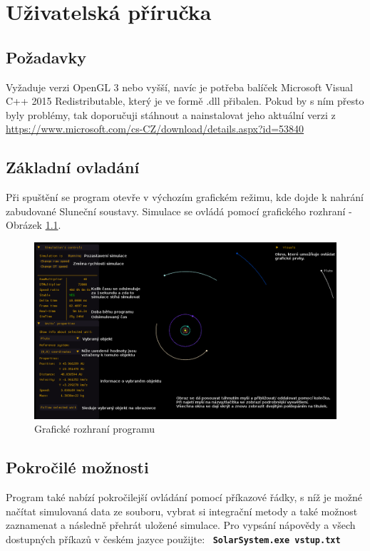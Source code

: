 \chapter{Uživatelská příručka}
\label{chap:userGuide}
\section{Požadavky}
Vyžaduje verzi OpenGL 3 nebo vyšší, navíc je potřeba balíček Microsoft Visual C++ 2015 Redistributable, který je ve formě .dll přibalen. Pokud by s ním přesto byly problémy, tak doporučuji stáhnout  a nainstalovat jeho aktuální verzi z \url{https://www.microsoft.com/cs-CZ/download/details.aspx?id=53840}
\section{Základní ovladání}
Při spuštění se program otevře v výchozím grafickém režimu, kde dojde k nahrání zabudované Sluneční soustavy. Simulace se ovládá pomocí grafického rozhraní - Obrázek \ref{fig:GUI1}.\\
\begin{figure}
	\caption{Grafické rozhraní programu}
	\label{fig:GUI1} 
	\centering
	\includegraphics[scale=0.5]{Figs/GUI1_edited}
\end{figure}
\FloatBarrier
\section{Pokročilé možnosti}
Program také nabízí pokročilejší ovládání pomocí příkazové řádky, s níž je možné načítat simulovaná data ze souboru, vybrat si integrační metody a také možnost zaznamenat a následně přehrát uložené simulace.
Pro vypsání nápovědy a všech dostupných příkazů v českém jazyce použijte:
\ \texttt{\textbf{SolarSystem.exe vstup.txt}}

